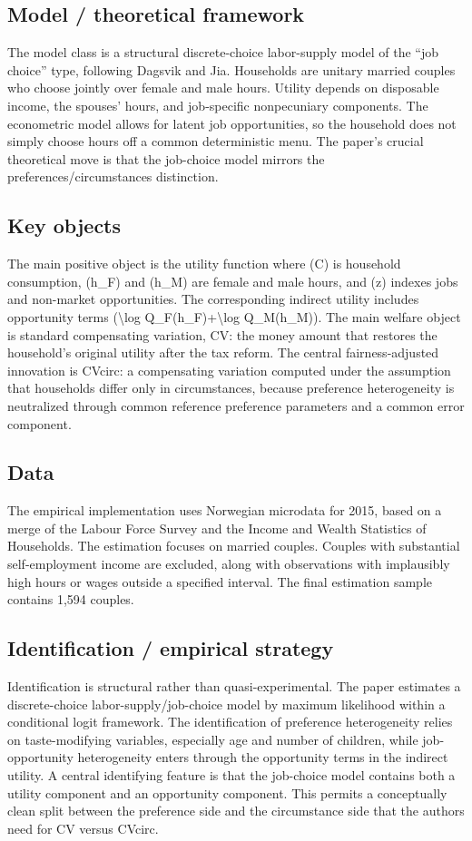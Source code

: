 \documentclass[11pt,a4paper]{article}
\begin{document}
\subsection*{Model / theoretical framework}
The model class is a structural discrete-choice labor-supply model of the “job choice” type, following Dagsvik and Jia. Households are unitary married couples who choose jointly over female and male hours. Utility depends on disposable income, the spouses’ hours, and job-specific nonpecuniary components. The econometric model allows for latent job opportunities, so the household does not simply choose hours off a common deterministic menu. The paper’s crucial theoretical move is that the job-choice model mirrors the preferences/circumstances distinction.

\subsection*{Key objects}
The main positive object is the utility function where (C) is household consumption, (h\_F) and (h\_M) are female and male hours, and (z) indexes jobs and non-market opportunities. The corresponding indirect utility includes opportunity terms (\textbackslash{}log Q\_F(h\_F)+\textbackslash{}log Q\_M(h\_M)). The main welfare object is standard compensating variation, CV: the money amount that restores the household’s original utility after the tax reform. The central fairness-adjusted innovation is CVcirc: a compensating variation computed under the assumption that households differ only in circumstances, because preference heterogeneity is neutralized through common reference preference parameters and a common error component.

\subsection*{Data}
The empirical implementation uses Norwegian microdata for 2015, based on a merge of the Labour Force Survey and the Income and Wealth Statistics of Households. The estimation focuses on married couples. Couples with substantial self-employment income are excluded, along with observations with implausibly high hours or wages outside a specified interval. The final estimation sample contains 1,594 couples.

\subsection*{Identification / empirical strategy}
Identification is structural rather than quasi-experimental. The paper estimates a discrete-choice labor-supply/job-choice model by maximum likelihood within a conditional logit framework. The identification of preference heterogeneity relies on taste-modifying variables, especially age and number of children, while job-opportunity heterogeneity enters through the opportunity terms in the indirect utility. A central identifying feature is that the job-choice model contains both a utility component and an opportunity component. This permits a conceptually clean split between the preference side and the circumstance side that the authors need for CV versus CVcirc.
\end{document}
